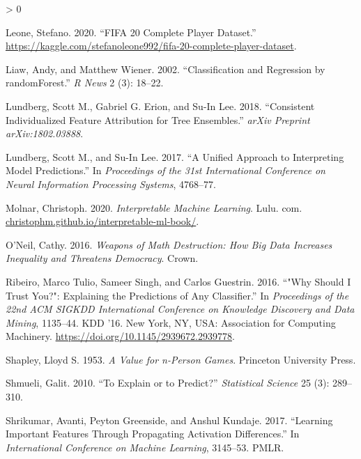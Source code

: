 \documentclass[
]{article}
\newlength{\cslhangindent}
\newenvironment{CSLReferences}[2] %
 {%
  \setlength{\parindent}{0pt}
  \ifodd #1 \everypar{\setlength{\hangindent}{\cslhangindent}}\ignorespaces\fi
  \ifnum #2 > 0
  \setlength{\parskip}{#2\baselineskip}
  \fi
 }%
 {}
\begin{document}
\begin{CSLReferences}{1}{0}
\leavevmode\hypertarget{ref-leone_fifa_2020}{}%
Leone, Stefano. 2020. {``{FIFA} 20 Complete Player Dataset.''} \url{https://kaggle.com/stefanoleone992/fifa-20-complete-player-dataset}.

\leavevmode\hypertarget{ref-liaw_classification_2002}{}%
Liaw, Andy, and Matthew Wiener. 2002. {``Classification and Regression by {randomForest}.''} \emph{R News} 2 (3): 18--22.

\leavevmode\hypertarget{ref-lundberg_consistent_2018}{}%
Lundberg, Scott M., Gabriel G. Erion, and Su-In Lee. 2018. {``Consistent Individualized Feature Attribution for Tree Ensembles.''} \emph{arXiv Preprint arXiv:1802.03888}.

\leavevmode\hypertarget{ref-lundberg_unified_2017}{}%
Lundberg, Scott M., and Su-In Lee. 2017. {``A Unified Approach to Interpreting Model Predictions.''} In \emph{Proceedings of the 31st International Conference on Neural Information Processing Systems}, 4768--77.

\leavevmode\hypertarget{ref-molnar_interpretable_2020}{}%
Molnar, Christoph. 2020. \emph{Interpretable Machine Learning}. Lulu. com. \href{https://christophm.github.io/interpretable-ml-book/}{christophm.github.io/interpretable-ml-book/}.

\leavevmode\hypertarget{ref-oneil_weapons_2016}{}%
O'Neil, Cathy. 2016. \emph{Weapons of Math Destruction: {How} Big Data Increases Inequality and Threatens Democracy}. Crown.

\leavevmode\hypertarget{ref-ribeiro_why_2016}{}%
Ribeiro, Marco Tulio, Sameer Singh, and Carlos Guestrin. 2016. {``"{Why} {Should} {I} {Trust} {You}?": {Explaining} the {Predictions} of {Any} {Classifier}.''} In \emph{Proceedings of the 22nd {ACM} {SIGKDD} {International} {Conference} on {Knowledge} {Discovery} and {Data} {Mining}}, 1135--44. {KDD} '16. New York, NY, USA: Association for Computing Machinery. \url{https://doi.org/10.1145/2939672.2939778}.

\leavevmode\hypertarget{ref-shapley_value_1953}{}%
Shapley, Lloyd S. 1953. \emph{A Value for n-Person Games}. Princeton University Press.

\leavevmode\hypertarget{ref-shmueli_explain_2010}{}%
Shmueli, Galit. 2010. {``To Explain or to Predict?''} \emph{Statistical Science} 25 (3): 289--310.

\leavevmode\hypertarget{ref-shrikumar_learning_2017}{}%
Shrikumar, Avanti, Peyton Greenside, and Anshul Kundaje. 2017. {``Learning Important Features Through Propagating Activation Differences.''} In \emph{International {Conference} on {Machine} {Learning}}, 3145--53. PMLR.


\end{CSLReferences}
\end{document}
